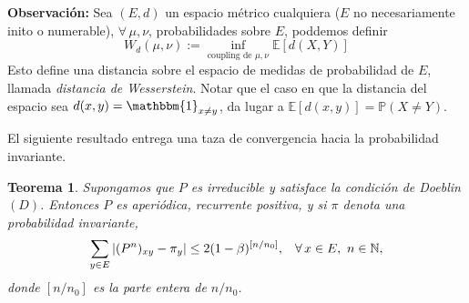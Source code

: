 \documentclass[a4paper]{article}
\newcommand{\prob}{\mathbb{P}}
\newtheorem{teorema}{Teorema}
\numberwithin{equation}{subsection}
\def\N{\mathbb N}
\def\E{\mathbb E}
\begin{document}
\textbf{Observación: }Sea $(E,d)$ un espacio métrico cualquiera ($E$ no necesariamente inito o numerable), $\forall\,\mu,\nu$, probabilidades sobre $E$, poddemos definir
\[W_d(\mu,\nu) :=\inf_{\text{coupling de }\mu,\nu} \E\left[d(X,Y)\right]\]
Esto define una distancia sobre el espacio de medidas de probabilidad de $E$, llamada \textit{distancia de Wesserstein}. Notar que el caso en que la distancia del espacio sea $d(x,y)=\mathbbm{1}_{x\neq y}$, da lugar a $\E\left[d(x,y)\right] = \prob(X\neq Y)$.\\ \newline

El siguiente resultado entrega una taza de convergencia hacia la probabilidad invariante.

\begin{teorema}
Supongamos que $P$ es irreducible y satisface la condición de Doeblin $(D)$. Entonces $P$ es aperiódica, recurrente positiva, y si $\pi$ denota una probabilidad invariante, 
\[\sum_{y\in E}|(P^n)_{xy}-\pi_y| \leq 2(1-\beta)^{[n/n_0]},\hspace{0.3cm}\forall\,x\in E,\,\,n\in \N,\]
donde $[n/n_0]$ es la parte entera de $n/n_0$.
\end{teorema}
\end{document}
